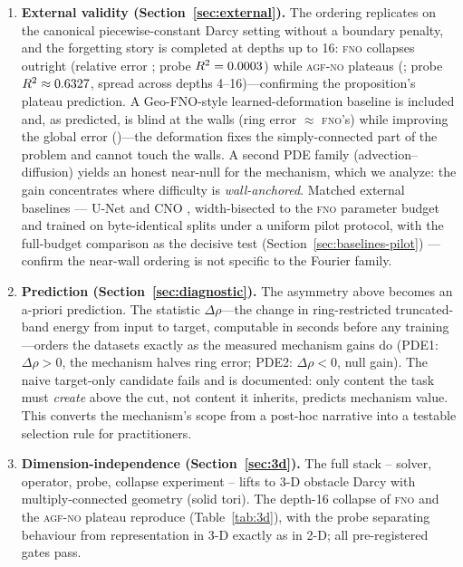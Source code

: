\documentclass[11pt]{article}
\theoremstyle{definition}
\newcommand{\fno}{\textsc{fno}}
\newcommand{\agfno}{\textsc{agf-no}}
\newcommand{\Rtwo}{R^2}
\begin{document}
\begin{enumerate}
      input channels (both models receive the same 3-channel input), or the
      boundary penalty (ablated: \PenaltyShareAgfRing{} share of ring error).
\item \textbf{External validity (Section~\ref{sec:external}).} The ordering
      replicates on the canonical piecewise-constant Darcy setting without a
      boundary penalty, and the forgetting story is completed at depths up to
      16: \fno{} collapses outright (relative error \DSixteenFnoRelL{};
      probe $\Rtwo = \ProbeExtFnoDSixteen$) while \agfno{} plateaus
      (\DSixteenAgfnoRelL{}; probe $\Rtwo \approx \ProbeExtAgfDSixteen$,
      spread \ProbeExtAgfPlateauSpread{} across depths 4--16)---confirming
      the proposition's plateau prediction. A Geo-FNO-style
      learned-deformation baseline is included and, as predicted, is blind at
      the walls (ring error \GeofnoRing{} $\approx$ \fno{}'s) while improving
      the global error (\GeofnoRelL{})---the deformation fixes the
      simply-connected part of the problem and cannot touch the walls. A
      second PDE family (advection--diffusion) yields an honest near-null for
      the mechanism, which we analyze: the gain concentrates where difficulty
      is \emph{wall-anchored}. Matched external baselines --- U-Net
      \citep{ronneberger2015unet} and CNO \citep{raonic2024cno},
      width-bisected to the \fno{} parameter budget and trained on
      byte-identical splits under a uniform pilot protocol, with the
      full-budget comparison as the decisive test
      (Section~\ref{sec:baselines-pilot}) --- confirm the near-wall ordering
      is not specific to the Fourier family.
\item \textbf{Prediction (Section~\ref{sec:diagnostic}).} The asymmetry above
      becomes an a-priori prediction. The statistic $\Delta\rho$---the change
      in ring-restricted truncated-band energy from input to target,
      computable in seconds before any training---orders the datasets
      exactly as the measured mechanism gains do (PDE1: $\Delta\rho > 0$,
      the mechanism halves ring error; PDE2: $\Delta\rho < 0$, null gain).
      The naive target-only candidate fails and is documented: only content
      the task must \emph{create} above the cut, not content it inherits,
      predicts mechanism value. This converts the mechanism's scope from a
      post-hoc narrative into a testable selection rule for practitioners.
\item \textbf{Dimension-independence (Section~\ref{sec:3d}).} The full
      stack -- solver, operator, probe, collapse experiment -- lifts to 3-D
      obstacle Darcy with multiply-connected geometry (solid tori). The
      depth-16 collapse of \fno{} and the \agfno{} plateau reproduce
      (Table~\ref{tab:3d}), with the probe separating behaviour from
      representation in 3-D exactly as in 2-D; all pre-registered gates pass.
\end{enumerate}
\end{document}
